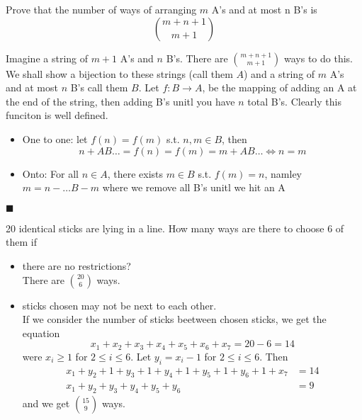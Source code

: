 \documentclass[12pt]{article}
\renewcommand{\qed}{\hfill$\blacksquare$}
\renewenvironment{proof}{\vspace{1em}\begin{addmargin}[2em]{0em}\begin{newproof}}{\end{newproof}\end{addmargin}\qed}
\newenvironment{exercise}[2][Exercise]{\begin{trivlist}
\item[\hskip \labelsep {\bfseries #1} \hskip \labelsep {\bfseries #2.}]}{\end{trivlist}}
\begin{document}
\begin{exercise}{Monday 9 (3pt)}
	Prove that the number of ways of arranging $m$ A's and at most n B's is \
	\[
		\binom{m + n + 1}{m + 1}
	\]
\end{exercise}	
\begin{proof}
	Imagine a string of $m + 1$ A's and $n$ B's. There are $\binom{m + n + 1}{m + 1}$ ways to do this. We shall show a bijection to these strings (call them $A$) and a string of $m$ A's and at most $n$ B's call them $B$. Let $f:B \to A$, be the mapping of adding an A at the end of the string, then adding B's unitl you have $n$ total B's. Clearly this funciton is well defined.
	\begin{itemize}
		\item[] One to one: let $f(n) = f(m)$ s.t. $n,m \in B$, then 
			\[
				n + AB\ldots = f(n) = f(m) = m + AB\ldots \iff n = m
			\]
		\item[] Onto: For all $n \in A$, there exists $m \in B$ s.t. $f(m) = n$, namley $m = n - \ldots B - m$ where we remove all B's unitl we hit an A	
	\end{itemize}
\end{proof}
\begin{exercise}{Monday 7 (3pt)}
	20 identical sticks are lying in a line. How many ways are there to choose
6 of them if
\begin{itemize}
	\item[(a)] there are no restrictions? \\
		There are $\binom{20}{6}$ ways.
	\item[(b)] sticks chosen may not be next to each other. \\
		If we consider the number of sticks beetween chosen sticks, we get the equation
		\[
			x_1 + x_2 + x_3 + x_4 + x_5 + x_6 + x_7 = 20 - 6 = 14
		\]
		were $x_i \ge 1$ for $2 \le i \le 6$. Let $y_i = x_i - 1$ for $2 \le i \le 6$. Then
		\begin{align*}
			x_1 + y_2 + 1 + y_3 + 1 + y_4 + 1 + y_5 + 1 + y_6 + 1 + x_7 &= 14 \\
			x_1 + y_2 + y_3 + y_4 + y_5 + y_6 &= 9
		\end{align*}
		and we get $\binom{15}{9}$ ways.
\end{itemize}
\end{exercise}	
\end{document}
